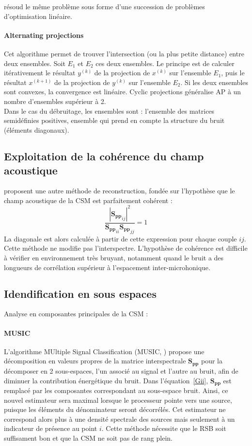 \cite{dougherty2016} résoud le même problème sous forme d'une succession de problèmes d'optimisation linéaire.


\paragraph{\tbullet Alternating projections}
Cet algorithme permet de trouver l'intersection  (ou la plus petite distance) entre deux ensembles. Soit $E_1$ et $E_2$ ces deux ensembles. Le principe est de calculer itérativement le résultat $y^{(k)}$ de la projection de $x^{(k)}$ sur l'ensemble $E_1$, puis le résultat $x^{(k+1)}$ de la projection de $y^{(k)}$ sur l'ensemble $E_2$. Si les deux ensembles sont convexes, la convergence est linéaire.
Cyclic projections généralise AP à un nombre d'ensembles supérieur à 2.\\
Dans le cas du débruitage, les ensembles sont : l'ensemble des matrices semidéfinies positives, ensemble qui prend en compte la structure du bruit (éléments diagonaux).

\subsection{Exploitation de la cohérence du champ acoustique}
\cite{finez:hal-01276687} proposent une autre méthode de reconstruction, fondée sur l'hypothèse que le champ acoustique de la CSM est parfaitement cohérent : 
\begin{equation}
\frac{|{\bm{S_{pp}}}_{ij}|^2}{{\bm{S_{pp}}}_{ii}{\bm{S_{pp}}}_{jj}} =1
\end{equation}
La diagonale est alors calculée à partir de cette expression pour chaque couple $ij$. Cette méthode ne modifie pas l'interspectre. L'hypothèse de cohérence est difficile à vérifier en environnement très bruyant, notamment quand le bruit a des longueurs de corrélation supérieur à l'espacement inter-microhonique.\\


\subsection{Idendification en sous espaces}
Analyse en composantes principales de la CSM : 
\paragraph{\tbullet MUSIC} L'algorithme MUltiple Signal Classification (MUSIC, \cite{Schmidt1986}) propose une décomposition en valeurs propres de la matrice interspectrale $\bm{S_{pp}}$ pour la décomposer en 2 sous-espaces, l’un associé au signal et l’autre au bruit, afin de diminuer la contribution énergétique du bruit.  Dans l'équation~\ref{Gii}, $\bm{S_{pp}}$ est remplacé par les composantes correspondant au sous-espace bruit. Ainsi, ce nouvel estimateur sera maximal lorsque le processeur pointe vers une source, puisque les éléments du dénominateur seront décorrélés. Cet estimateur ne correspond alors plus à une densité spectrale des sources mais seulement à un indicateur de présence au point $i$. Cette méthode nécessite que le RSB soit suffisament bon et que la CSM ne soit pas de rang plein.\\

